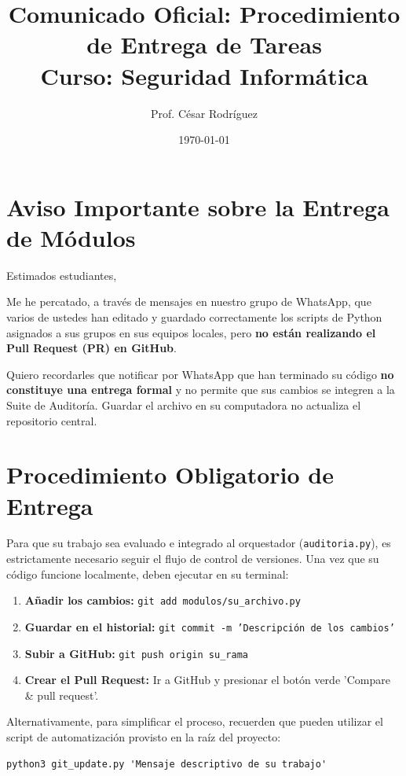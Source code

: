 \documentclass[12pt,a4paper]{article}
\title{Comunicado Oficial: Procedimiento de Entrega de Tareas \\ \large Curso: Seguridad Informática}
\author{Prof. César Rodríguez}
\date{\today}
\begin{document}
\maketitle

\section*{Aviso Importante sobre la Entrega de Módulos}

Estimados estudiantes,

Me he percatado, a través de mensajes en nuestro grupo de WhatsApp, que varios de ustedes han editado y guardado correctamente los scripts de Python asignados a sus grupos en sus equipos locales, pero \textbf{no están realizando el Pull Request (PR) en GitHub}.

Quiero recordarles que notificar por WhatsApp que han terminado su código \textbf{no constituye una entrega formal} y no permite que sus cambios se integren a la Suite de Auditoría. Guardar el archivo en su computadora no actualiza el repositorio central.

\section*{Procedimiento Obligatorio de Entrega}

Para que su trabajo sea evaluado e integrado al orquestador (\texttt{auditoria.py}), es estrictamente necesario seguir el flujo de control de versiones. Una vez que su código funcione localmente, deben ejecutar en su terminal:

\begin{enumerate}
    \item \textbf{Añadir los cambios:} \texttt{git add modulos/su\_archivo.py}
    \item \textbf{Guardar en el historial:} \texttt{git commit -m 'Descripción de los cambios'}
    \item \textbf{Subir a GitHub:} \texttt{git push origin su\_rama}
    \item \textbf{Crear el Pull Request:} Ir a GitHub y presionar el botón verde 'Compare \& pull request'.
\end{enumerate}

Alternativamente, para simplificar el proceso, recuerden que pueden utilizar el script de automatización provisto en la raíz del proyecto:
\begin{verbatim}
python3 git_update.py 'Mensaje descriptivo de su trabajo'
\end{verbatim}
\end{document}
